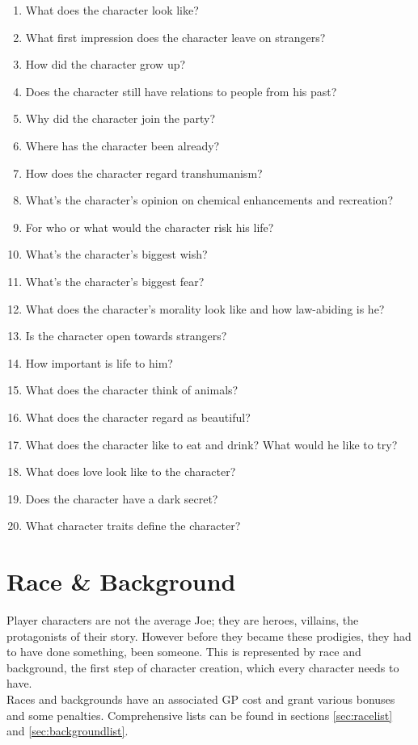 \documentclass[12pt,a4paper,openany]{book}
\begin{document}
	\begin{enumerate}
		\setlength\itemsep{-8mm}
		\item What does the character look like?
		\item What first impression does the character leave on strangers?
		\item How did the character grow up?
		\item Does the character still have relations to people from his past?
		\item Why did the character join the party?
		\item Where has the character been already?
		\item How does the character regard transhumanism?
		\item What’s the character’s opinion on chemical enhancements and recreation?
		\item For who or what would the character risk his life?
		\item What’s the character’s biggest wish?
		\item What’s the character’s biggest fear?
		\item What does the character’s morality look like and how law-abiding is he?
		\item Is the character open towards strangers?
		\item How important is life to him?
		\item What does the character think of animals?
		\item What does the character regard as beautiful?
		\item What does the character like to eat and drink? What would he like to try?
		\item What does love look like to the character?
		\item Does the character have a dark secret?
		\item What character traits define the character?
	\end{enumerate}
	\section{Race \& Background}
	Player characters are not the average Joe; they are heroes, villains, the protagonists of their story. However before they became these prodigies, they had to have done something, been someone. This is represented by race and background, the first step of character creation, which every character needs to have.\\
	Races and backgrounds have an associated GP cost and grant various bonuses and some penalties. Comprehensive lists can be found in sections \ref{sec:racelist} and \ref{sec:backgroundlist}.
\end{document}
